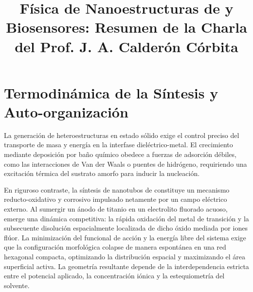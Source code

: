 \documentclass[pdflatex,sn-mathphys-num]{sn-jnl}
\theoremstyle{thmstyleone}%
\theoremstyle{thmstyletwo}%
\theoremstyle{thmstylethree}%
\begin{document}
\title[Nanoestructuras de \ce{TiO2}]{Física de Nanoestructuras de  y
Biosensores: Resumen de la Charla del Prof. J. A. Calderón Córbita}

\author{
}




\maketitle

\section{Termodinámica de la Síntesis y Auto-organización}
\label{sec:sintesis}

La generación de heteroestructuras en estado sólido exige el control preciso
del transporte de masa y energía en la interfase dieléctrico-metal.
El crecimiento mediante deposición por baño químico obedece a fuerzas de
adsorción débiles, como las interacciones de Van der Waals o puentes de
hidrógeno, requiriendo una excitación térmica del sustrato amorfo para inducir
la nucleación.

En riguroso contraste, la síntesis de nanotubos de  constituye un
mecanismo reducto-oxidativo y corrosivo impulsado netamente por un campo
eléctrico externo. Al sumergir un ánodo de titanio
en un electrolito fluorado acuoso, emerge una dinámica competitiva: la rápida
oxidación del metal de transición y la subsecuente disolución espacialmente
localizada de dicho óxido mediada por iones flúor.
La minimización del funcional de acción y la energía libre del sistema exige
que la configuración morfológica colapse de manera espontánea en una red
hexagonal compacta, optimizando la distribución espacial y maximizando el
área superficial activa. La geometría resultante
depende de la interdependencia estricta entre el potencial aplicado,
la concentración iónica y la estequiometría del solvente.
\end{document}
